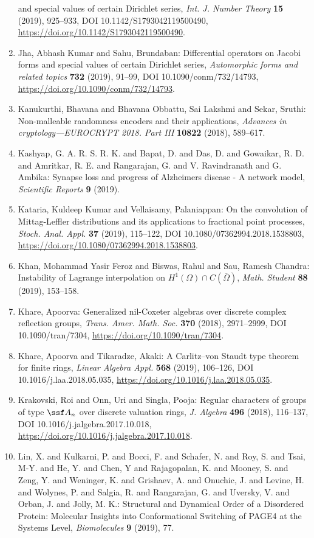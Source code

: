 \begin{enumerate}
and special values of certain {D}irichlet series, \emph{Int. J. Number Theory} {\bf 15} (2019), 925--933, DOI 10.1142/S1793042119500490, \url{https://doi.org/10.1142/S1793042119500490}.
\item Jha, Abhash Kumar and Sahu, Brundaban: Differential operators on {J}acobi forms and special values of
certain {D}irichlet series, \emph{Automorphic forms and related topics} {\bf 732} (2019), 91--99, DOI 10.1090/conm/732/14793, \url{https://doi.org/10.1090/conm/732/14793}.
\item Kanukurthi, Bhavana and Bhavana Obbattu, Sai Lakshmi and
Sekar, Sruthi: Non-malleable randomness encoders and their applications, \emph{Advances in cryptology---{EUROCRYPT} 2018. {P}art {III}} {\bf 10822} (2018), 589--617.
\item Kashyap, G. A. R. S. R. K. and Bapat, D. and Das, D. and Gowaikar, R. D. and  Amritkar, R. E. and Rangarajan, G. and V. Ravindranath and G. Ambika: Synapse loss and progress of Alzheimers disease - A network model, \emph{Scientific Reports} {\bf 9} (2019).
\item Kataria, Kuldeep Kumar and Vellaisamy, Palaniappan: On the convolution of {M}ittag-{L}effler distributions and its
applications to fractional point processes, \emph{Stoch. Anal. Appl.} {\bf 37} (2019), 115--122, DOI 10.1080/07362994.2018.1538803, \url{https://doi.org/10.1080/07362994.2018.1538803}.
\item Khan, Mohammad Yasir Feroz and Biswas, Rahul and Sau, Ramesh
Chandra: Instability of {L}agrange interpolation on {$H^1(\Omega)\cap
C(\overline\Omega)$}, \emph{Math. Student} {\bf 88} (2019), 153--158.
\item Khare, Apoorva: Generalized nil-{C}oxeter algebras over discrete complex
reflection groups, \emph{Trans. Amer. Math. Soc.} {\bf 370} (2018), 2971--2999, DOI 10.1090/tran/7304, \url{https://doi.org/10.1090/tran/7304}.
\item Khare, Apoorva and Tikaradze, Akaki: A {C}arlitz--von {S}taudt type theorem for finite rings, \emph{Linear Algebra Appl.} {\bf 568} (2019), 106--126, DOI 10.1016/j.laa.2018.05.035, \url{https://doi.org/10.1016/j.laa.2018.05.035}.
\item Krakovski, Roi and Onn, Uri and Singla, Pooja: Regular characters of groups of type {$\ssf A_n$} over
discrete valuation rings, \emph{J. Algebra} {\bf 496} (2018), 116--137, DOI 10.1016/j.jalgebra.2017.10.018, \url{https://doi.org/10.1016/j.jalgebra.2017.10.018}.
\item Lin, X. and Kulkarni, P. and Bocci, F. and Schafer, N. and Roy, S. and Tsai, M-Y. and He, Y. and Chen, Y and Rajagopalan, K. and Mooney, S. and Zeng, Y. and Weninger, K. and Grishaev, A. and Onuchic, J. and Levine, H. and Wolynes, P. and Salgia, R. and Rangarajan, G. and Uversky, V. and Orban, J. and Jolly, M. K.: Structural and Dynamical Order of a Disordered Protein: Molecular Insights into Conformational Switching of PAGE4 at the Systems Level, \emph{Biomolecules} {\bf 9} (2019), 77.

\end{enumerate}

